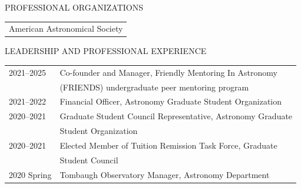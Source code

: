 \medskip

\doublespacing
\begin{center}
PROFESSIONAL ORGANIZATIONS
\end{center}
\begin{flushleft}
\begin{tabular}{l}
American Astronomical Society \\
\end{tabular}
\end{flushleft}

\begin{center}
LEADERSHIP AND PROFESSIONAL EXPERIENCE
\end{center}
\begin{flushleft}
\begin{tabular}{ll}
2021--2025 & Co-founder and Manager, Friendly Mentoring In Astronomy \\
           & (FRIENDS) undergraduate peer mentoring program \\
2021--2022 & Financial Officer, Astronomy Graduate Student Organization \\
2020--2021 & Graduate Student Council Representative, Astronomy Graduate \\
	   & Student Organization \\
2020--2021 & Elected Member of Tuition Remission Task Force, Graduate \\
           & Student Council \\
2020 Spring & Tombaugh Observatory Manager, Astronomy Department \\
\end{tabular}
\end{flushleft}
